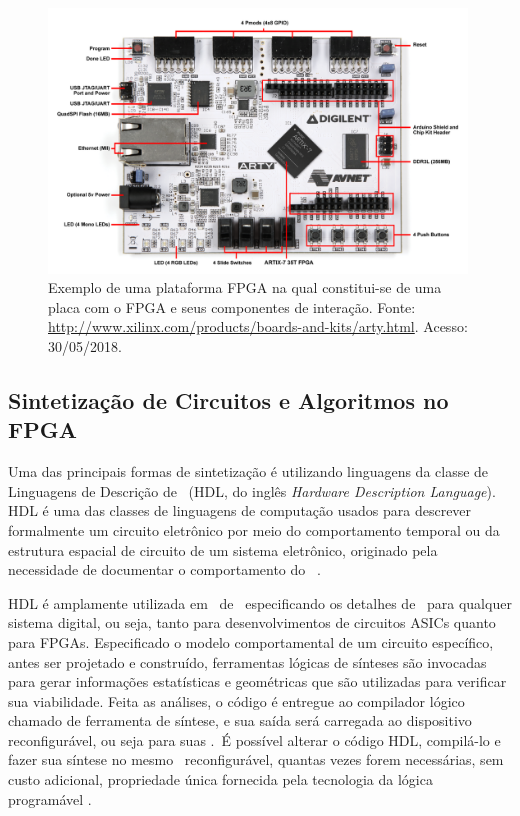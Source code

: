         \begin{figure}[h] \centering
            \includegraphics[width=0.99\textwidth]{img/arty.png}
            \caption{Exemplo de uma plataforma FPGA na qual constitui-se de uma placa com o FPGA e seus componentes de interação. Fonte: \url{http://www.xilinx.com/products/boards-and-kits/arty.html}. Acesso: 30/05/2018.}
            \label{fig:rb-arty}
        \end{figure}
   
   
   
    \subsection{Sintetização de Circuitos e Algoritmos no FPGA}
    
        Uma das principais formas de sintetização é utilizando linguagens da classe de Linguagens de Descrição de \Hardware\ (HDL, do inglês \textit{Hardware Description Language}).
        HDL é uma das classes de linguagens de computação usados para descrever formalmente um circuito eletrônico por meio do comportamento temporal ou da estrutura espacial de circuito de um sistema eletrônico, originado pela necessidade de documentar o comportamento do \hardware\ \citep{Sass2010}.
        
        HDL é amplamente utilizada em \design\ de \hardware\ especificando os detalhes de \design\ para qualquer sistema digital, ou seja, tanto para desenvolvimentos de circuitos ASICs quanto para FPGAs.
        Especificado o modelo comportamental de um circuito específico, antes ser projetado e construído, ferramentas lógicas de sínteses são invocadas para gerar informações estatísticas e geométricas que são utilizadas para verificar sua viabilidade.
        Feita as análises, o código é entregue ao compilador lógico chamado de ferramenta de síntese, e sua saída será carregada ao dispositivo reconfigurável, ou seja para suas \luts.\ 
        É possível alterar o código HDL, compilá-lo e fazer sua síntese no mesmo \hardware\ reconfigurável, quantas vezes forem necessárias, sem custo adicional, propriedade única fornecida pela tecnologia da lógica programável \citep{Smith1998}.
        
